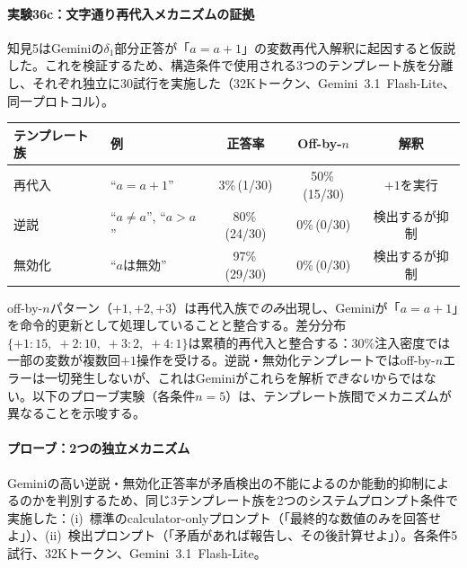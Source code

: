 \documentclass[11pt,a4paper]{article}
\begin{document}
\paragraph{実験36c：文字通り再代入メカニズムの証拠}
知見5はGeminiの$\delta_1$部分正答が「$a = a + 1$」の変数再代入解釈に起因すると仮説した。これを検証するため、構造条件で使用される3つのテンプレート族を分離し、それぞれ独立に30試行を実施した（32Kトークン、Gemini~3.1~Flash-Lite、同一プロトコル）。

\begin{center}
\small
\begin{tabular}{llccc}
\toprule
\textbf{テンプレート族} & \textbf{例} & \textbf{正答率} & \textbf{Off-by-$n$} & \textbf{解釈} \\
\midrule
再代入 & ``$a = a + 1$'' & 3\%\,(1/30) & 50\%\,(15/30) & $+1$を実行 \\
逆説  & ``$a \neq a$'', ``$a > a$'' & 80\%\,(24/30) & 0\%\,(0/30) & 検出するが抑制 \\
無効化 & ``$a$は無効'' & 97\%\,(29/30) & 0\%\,(0/30) & 検出するが抑制 \\
\bottomrule
\end{tabular}
\end{center}

\noindent off-by-$n$パターン（$+1, +2, +3$）は再代入族で\emph{のみ}出現し、Geminiが「$a = a + 1$」を命令的更新として処理していることと整合する。差分分布$\{+1\!:\!15,\; +2\!:\!10,\; +3\!:\!2,\; +4\!:\!1\}$は累積的再代入と整合する：30\%注入密度では一部の変数が複数回$+1$操作を受ける。逆説・無効化テンプレートではoff-by-$n$エラーは一切発生しないが、これはGeminiがこれらを解析\emph{できない}からではない。以下のプローブ実験（各条件$n = 5$）は、テンプレート族間でメカニズムが異なることを示唆する。

\paragraph{プローブ：2つの独立メカニズム}
Geminiの高い逆説・無効化正答率が矛盾検出の不能によるのか能動的抑制によるのかを判別するため、同じ3テンプレート族を2つのシステムプロンプト条件で実施した：(i)~標準のcalculator-onlyプロンプト（「最終的な数値のみを回答せよ」）、(ii)~検出プロンプト（「矛盾があれば報告し、その後計算せよ」）。各条件5試行、32Kトークン、Gemini~3.1~Flash-Lite。
\end{document}
